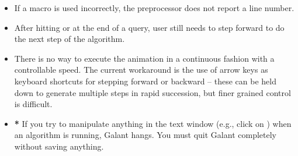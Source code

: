 \begin{itemize}
\item
  If a macro is used incorrectly,
  the preprocessor does not report a line number.

\item After hitting  or  at the end of a query,
  user still needs to step forward to do the next step of the algorithm.

\item
  There is no way to execute the animation in a continuous fashion with a
  controllable speed.
  The current workaround is the use of arrow keys as keyboard
  shortcuts for stepping forward or backward -- these can be held down to
  generate multiple steps in rapid succession, but finer grained control is
  difficult.

\item \textbf{*}
  If you try to manipulate anything in the text window (e.g., click on
  ) when an algorithm is running, Galant hangs. You must quit
  Galant completely without saving anything.

\end{itemize}

